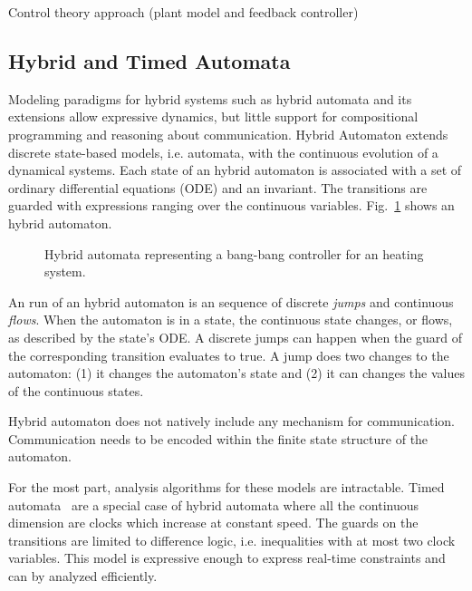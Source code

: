 \documentclass[
graybox,
envcountchap
]{svmult}
\begin{document}
\begin{bibunit}
    Control theory approach (plant model and feedback controller)

    \subsection{Hybrid and Timed Automata}

Modeling paradigms for hybrid systems such as hybrid automata and its extensions \cite{DBLP:conf/lics/Henzinger96,AlurGLS06,DBLP:journals/iandc/LynchSV03} allow expressive dynamics, but little support for compositional programming and reasoning about communication.
Hybrid Automaton extends discrete state-based models, i.e. automata, with the continuous evolution of a dynamical systems.
Each state of an hybrid automaton is associated with a set of ordinary differential equations (ODE) and an invariant.
The transitions are guarded with expressions ranging over the continuous variables.
Fig.~\ref{fig:HA-ex1} shows an hybrid automaton.

\begin{figure}
\centering

\caption{Hybrid automata representing a bang-bang controller for an heating system.}
\label{fig:HA-ex1}
\end{figure}

An run of an hybrid automaton is an sequence of discrete \emph{jumps} and continuous \emph{flows}.
When the automaton is in a state, the continuous state changes, or flows, as described by the state's ODE.
A discrete jumps can happen when the guard of the corresponding transition evaluates to true.
A jump does two changes to the automaton: (1) it changes the automaton's state and (2) it can changes the values of the continuous states.

Hybrid automaton does not natively include any mechanism for communication.
Communication needs to be encoded within the finite state structure of the automaton.

For the most part, analysis algorithms for these models are intractable.
Timed automata~\cite{DBLP:journals/tcs/AlurD94} are a special case of hybrid automata where all the continuous dimension are clocks which increase at constant speed.
The guards on the transitions are limited to difference logic, i.e. inequalities with at most two clock variables.
This model is expressive enough to express real-time constraints and can by analyzed efficiently. %



\end{bibunit}
\end{document}

